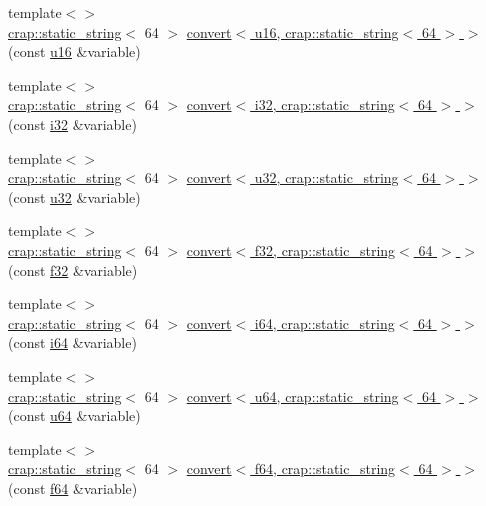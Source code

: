\begin{DoxyCompactItemize}
\item 
{\footnotesize template$<$$>$ }\\\hyperlink{classcrap_1_1static__string}{crap\-::static\-\_\-string}$<$ 64 $>$ \hyperlink{namespacecrap_a50d67b85de4d09659c2475e981b19daf}{convert$<$ u16, crap\-::static\-\_\-string$<$ 64 $>$ $>$} (const \hyperlink{types_8h_ace9d960e74685e2cd84b36132dbbf8aa}{u16} \&variable)
\item 
{\footnotesize template$<$$>$ }\\\hyperlink{classcrap_1_1static__string}{crap\-::static\-\_\-string}$<$ 64 $>$ \hyperlink{namespacecrap_a6c16304c56828c68319ecddd4ced3a15}{convert$<$ i32, crap\-::static\-\_\-string$<$ 64 $>$ $>$} (const \hyperlink{types_8h_a48d6cd8e4135fb2ff7e7f2dac84089ec}{i32} \&variable)
\item 
{\footnotesize template$<$$>$ }\\\hyperlink{classcrap_1_1static__string}{crap\-::static\-\_\-string}$<$ 64 $>$ \hyperlink{namespacecrap_af012ce2081d1b24946c798a5a2d15797}{convert$<$ u32, crap\-::static\-\_\-string$<$ 64 $>$ $>$} (const \hyperlink{types_8h_afaa62991928fb9fb18ff0db62a040aba}{u32} \&variable)
\item 
{\footnotesize template$<$$>$ }\\\hyperlink{classcrap_1_1static__string}{crap\-::static\-\_\-string}$<$ 64 $>$ \hyperlink{namespacecrap_adb07df63e7d56784f4d2cf9a3ac141a2}{convert$<$ f32, crap\-::static\-\_\-string$<$ 64 $>$ $>$} (const \hyperlink{types_8h_a154db6eda6a99565cb060a1da4b4c930}{f32} \&variable)
\item 
{\footnotesize template$<$$>$ }\\\hyperlink{classcrap_1_1static__string}{crap\-::static\-\_\-string}$<$ 64 $>$ \hyperlink{namespacecrap_a5395de016bbd47d1fd0e21ef83a1e39f}{convert$<$ i64, crap\-::static\-\_\-string$<$ 64 $>$ $>$} (const \hyperlink{types_8h_a85cb35fbe5bf2961d7ad5f26814a91a2}{i64} \&variable)
\item 
{\footnotesize template$<$$>$ }\\\hyperlink{classcrap_1_1static__string}{crap\-::static\-\_\-string}$<$ 64 $>$ \hyperlink{namespacecrap_aed68c4cc0d0d89d062a85e7d02ff8a3e}{convert$<$ u64, crap\-::static\-\_\-string$<$ 64 $>$ $>$} (const \hyperlink{types_8h_a3f7e2bcbb0b4c338f3c4f6c937cd4234}{u64} \&variable)
\item 
{\footnotesize template$<$$>$ }\\\hyperlink{classcrap_1_1static__string}{crap\-::static\-\_\-string}$<$ 64 $>$ \hyperlink{namespacecrap_a4707288371355e4a92deeb993315df28}{convert$<$ f64, crap\-::static\-\_\-string$<$ 64 $>$ $>$} (const \hyperlink{types_8h_a76c9f53497f766e57b184bc8a93ab73f}{f64} \&variable)

\end{DoxyCompactItemize}
